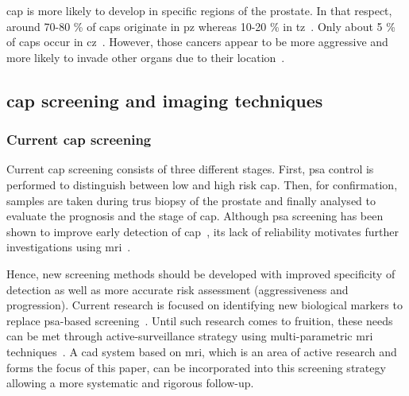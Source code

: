 \ac{cap} is more likely to develop in specific regions of the prostate. In that respect, around 70-80 \% of \acp{cap} originate in \ac{pz} whereas 10-20 \% in \ac{tz}~\cite{Carrol1987,McNeal1988,Stamey1998}. Only about 5 \% of \acp{cap} occur in \ac{cz}~\cite{McNeal1988,Cohen2008}. However, those cancers appear to be more aggressive and more likely to invade other organs due to their location~\cite{Cohen2008}.

\subsection{\ac{cap} screening and imaging techniques}

\subsubsection{Current \ac{cap} screening}\label{subsubsec:curscr}

Current \ac{cap} screening consists of three different stages. First, \ac{psa} control is performed to distinguish between low and high risk \ac{cap}. Then, for confirmation, samples are taken during \ac{trus} biopsy of the prostate and finally analysed to evaluate the prognosis and the stage of \ac{cap}. Although \ac{psa} screening has been shown to improve early detection of \ac{cap}~\cite{Chou2011}, its lack of reliability motivates further investigations using \ac{mri}~\cite{Andriole2009,Schroeder2012, Hugosson2010}.

Hence, new screening methods should be developed with improved specificity of detection as well as more accurate risk assessment (aggressiveness and progression). Current research is focused on identifying new biological markers to replace \ac{psa}-based screening~\cite{Bourdoumis2010,Morgan2011,Brenner2013}. Until such research comes to fruition, these needs can be met through active-surveillance strategy using multi-parametric \ac{mri} techniques~\cite{Hoeks2011,Moore2013}. A \acs{cad} system based on \ac{mri}, which is an area of active research and forms the focus of this paper, can be incorporated into this screening strategy allowing a more systematic and rigorous follow-up.

